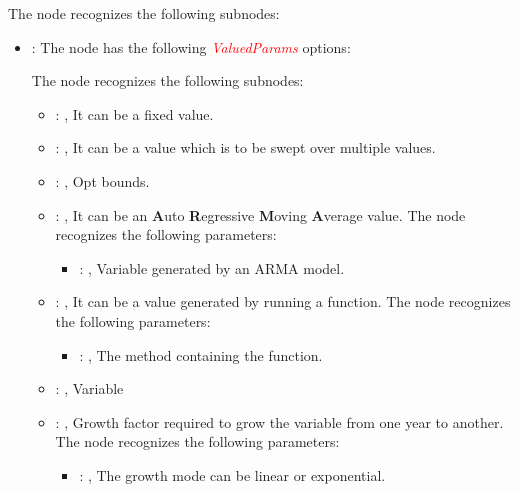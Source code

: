   The  node recognizes the following subnodes:
  \begin{itemize}
    \item {}:
      The node  has the following \textcolor{red}{\textit{ValuedParams}} options:

      The  node recognizes the following subnodes:
      \begin{itemize}
        \item {}: , 
          It can be a fixed value.

        \item {}: , 
          It can be a value which is to be swept over multiple values.

        \item {}: , 
          Opt bounds.

        \item {}: , 
          It can be an \textbf{A}uto \textbf{R}egressive \textbf{M}oving \textbf{A}verage value.
          The  node recognizes the following parameters:
            \begin{itemize}
              \item {}: , 
                Variable generated by an ARMA model.
          \end{itemize}

        \item {}: , 
          It can be a value generated by running a function.
          The  node recognizes the following parameters:
            \begin{itemize}
              \item {}: , 
                The method containing the function.
          \end{itemize}

        \item {}: , 
          Variable

        \item {}: , 
          Growth factor required to grow the variable from one year to another.
          The  node recognizes the following parameters:
            \begin{itemize}
              \item {}: , 
                The growth mode can be linear or exponential.
          \end{itemize}
      \end{itemize}


\end{itemize}
